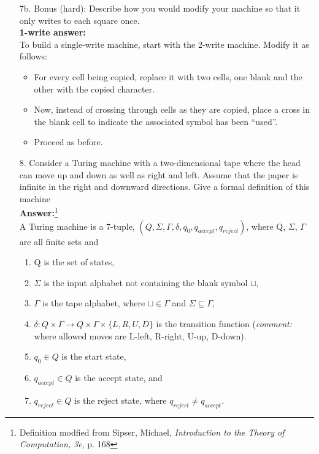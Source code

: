 \documentclass[12pt]{article}
\begin{document}
\begin{itemize}
\item[{\rm 7b.}] Bonus (hard): Describe how you would modify your machine so that it only writes to each square once.
	\\[.2in] \textbf{1-write answer:}
	\\[.2in] To build a single-write machine, start with the 2-write machine. Modify it as follows:
	\begin{itemize}
	\item For every cell being copied, replace it with two cells, one blank and the other with the copied character.
	\item Now, instead of crossing through cells as they are copied, place a cross in the blank cell to indicate the associated symbol has been ``used''.
	\item Proceed as before.
	\end{itemize}
	\vspace{.2in}
\newpage
\item[{\rm 8.}] Consider a Turing machine with a two-dimensional tape where the head can move up and down as well as right and left.  Assume that the paper is infinite in the right and downward directions.  Give a formal definition of this machine
\\[.2in]\textbf{Answer:}\footnote{Definition modfied from Sipser, Michael, \textit{Introduction to the Theory of Computation, 3e}, p. 168}
	\vspace{.2in}
	\\ A Turing machine is a 7-tuple, $(Q, \Sigma, \Gamma, \delta, q_{0}, q_{accept}, q_{reject})$, where Q, $\Sigma$, $\Gamma$ are all finite sets and
	\begin{enumerate}
	\item Q is the set of states,
	\item $\Sigma$ is the input alphabet not containing the blank symbol $\sqcup$, 
	\item $\Gamma$ is the tape alphabet, where $\sqcup \in \Gamma$ and $\Sigma \subseteq \Gamma$,
	\item $\delta:Q\times\Gamma \rightarrow Q\times\Gamma \times\{L,R,U,D\}$ is the transition function (\textit{comment:} where allowed moves are L-left, R-right, U-up, D-down).
	\item $q_{0} \in Q$ is the start state,
	\item $q_{accept} \in Q$ is the accept state, and
	\item $q_{reject} \in Q$ is the reject state, where $q_{reject} \neq q_{accept}$.
	\end{enumerate}
	\vspace{.2in}
\end{itemize}
\end{document}

